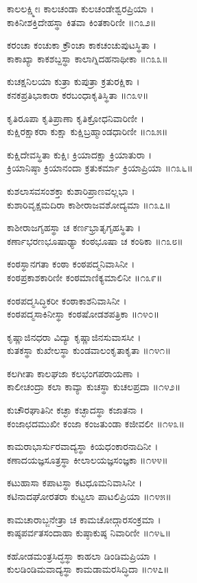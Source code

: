 ಕಾಲಲಕ್ಷ್ಮೀಃ ಕಾಲಚಂಡಾ ಕುಲಚಂಡೇಶ್ವರಪ್ರಿಯಾ ।\\
ಕಾಕಿನೀಶಕ್ತಿದೇಹಸ್ಥಾ ಕಿತವಾ ಕಿಂತಕಾರಿಣೀ ॥೧೩೨॥

ಕರಂಚಾ ಕಂಚುಕಾ ಕ್ರೌಂಚಾ ಕಾಕಚಂಚುಪುಟಸ್ಥಿತಾ ।\\
ಕಾಕಾಖ್ಯಾ ಕಾಕಶಬ್ದಸ್ಥಾ ಕಾಲಾಗ್ನಿದಹನಾಥೀಕಾ ॥೧೩೩॥

ಕುಚಕ್ಷನಿಲಯಾ ಕುತ್ರಾ ಕುಪುತ್ರಾ ಕ್ರತುರಕ್ಷಿಕಾ ।\\
ಕನಕಪ್ರತಿಭಾಕಾರಾ ಕರಬಂಧಾಕೃತಿಸ್ಥಿತಾ ॥೧೩೪॥

ಕೃತಿರೂಪಾ ಕೃತಿಪ್ರಾಣಾ ಕೃತಿಕ್ರೋಧನಿವಾರಿಣೀ ।\\
ಕುಕ್ಷಿರಕ್ಷಾಕರಾ ಕುಕ್ಷಾ ಕುಕ್ಷಿಬ್ರಹ್ಮಾಂಡಧಾರಿಣೀ ॥೧೩೫॥

ಕುಕ್ಷಿದೇವಸ್ಥಿತಾ ಕುಕ್ಷಿಃ ಕ್ರಿಯಾದಕ್ಷಾ ಕ್ರಿಯಾತುರಾ ।\\
ಕ್ರಿಯಾನಿಷ್ಠಾ ಕ್ರಿಯಾನಂದಾ ಕ್ರತುಕರ್ಮಾ ಕ್ರಿಯಾಪ್ರಿಯಾ ॥೧೩೬॥

ಕುಶಲಾಸವಸಂಶಕ್ತಾ ಕುಶಾರಿಪ್ರಾಣವಲ್ಲಭಾ ।\\
ಕುಶಾರಿವೃಕ್ಷಮದಿರಾ ಕಾಶೀರಾಜವಶೋದ್ಯಮಾ ॥೧೩೭॥

ಕಾಶೀರಾಜಗೃಹಸ್ಥಾ ಚ ಕರ್ಣಭ್ರಾತೃಗೃಹಸ್ಥಿತಾ ।\\
ಕರ್ಣಾಭರಣಭೂಷಾಢ್ಯಾ ಕಂಠಭೂಷಾ ಚ ಕಂಠಿಕಾ ॥೧೩೮॥

ಕಂಠಸ್ಥಾನಗತಾ ಕಂಠಾ ಕಂಠಪದ್ಮನಿವಾಸಿನೀ ।\\
ಕಂಠಪ್ರಕಾಶಕಾರಿಣೀ ಕಂಠಮಾಣಿಕ್ಯಮಾಲಿನೀ ॥೧೩೯॥

ಕಂಠಪದ್ಮಸಿದ್ಧಿಕರೀ ಕಂಠಾಕಾಶನಿವಾಸಿನೀ ।\\
ಕಂಠಪದ್ಮಸಾಕಿನೀಸ್ಥಾ ಕಂಠಷೋಡಶಪತ್ರಿಕಾ ॥೧೪೦॥

ಕೃಷ್ಣಾಜಿನಧರಾ ವಿದ್ಯಾ ಕೃಷ್ಣಾಜಿನಸುವಾಸಸೀ ।\\
ಕುತಕಸ್ಥಾ ಕುಖೇಲಸ್ಥಾ ಕುಂಡವಾಲಂಕೃತಾಕೃತಾ ॥೧೪೧॥

ಕಲಗೀತಾ ಕಾಲಘಜಾ ಕಲಭಂಗಪರಾಯಣಾ ।\\
ಕಾಲೀಚಂದ್ರಾ ಕಲಾ ಕಾವ್ಯಾ ಕುಚಸ್ಥಾ ಕುಚಲಪ್ರದಾ ॥೧೪೨॥

ಕುಚೌರಘಾತಿನೀ ಕಚ್ಛಾ ಕಚ್ಛಾದಸ್ಥಾ ಕಜಾತನಾ ।\\
ಕಂಜಾಛದಮುಖೀ ಕಂಜಾ ಕಂಜತುಂಡಾ ಕಜೀವಲೀ ॥೧೪೩॥

ಕಾಮರಾಭಾರ್ಸುರವಾದ್ಯಸ್ಥಾ ಕಿಯಧಂಕಾರನಾದಿನೀ ।\\
ಕಣಾದಯಜ್ಞಸೂತ್ರಸ್ಥಾ ಕೀಲಾಲಯಜ್ಞಸಂಜ್ಞಕಾ ॥೧೪೪॥

ಕಟುಹಾಸಾ ಕಪಾಟಸ್ಥಾ ಕಟಧೂಮನಿವಾಸಿನೀ ।\\
ಕಟಿನಾದಘೋರತರಾ ಕುಟ್ಟಲಾ ಪಾಟಲಿಪ್ರಿಯಾ ॥೧೪೫॥

ಕಾಮಚಾರಾಬ್ಜನೇತ್ರಾ ಚ ಕಾಮಚೋದ್ಗಾರಸಂಕ್ರಮಾ ।\\
ಕಾಷ್ಠಪರ್ವತಸಂದಾಹಾ ಕುಷ್ಠಾಕುಷ್ಠ ನಿವಾರಿಣೀ ॥೧೪೬॥

ಕಹೋಡಮಂತ್ರಸಿದ್ಧಸ್ಥಾ ಕಾಹಲಾ ಡಿಂಡಿಮಪ್ರಿಯಾ ।\\
ಕುಲಡಿಂಡಿಮವಾದ್ಯಸ್ಥಾ ಕಾಮಡಾಮರಸಿದ್ಧಿದಾ ॥೧೪೭॥

